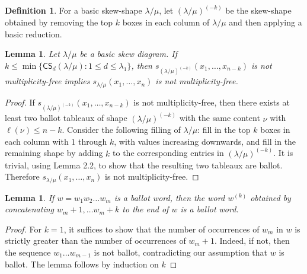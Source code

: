 \documentclass[10pt]{article}
\newtheorem{lemma}[theorem]{Lemma}
\theoremstyle{definition}
\newtheorem{defi}[theorem]{Definition}
\newcommand{\CS	}{\mathsf{CS}}
\begin{document}
\begin{defi}
For a basic skew-shape $\lambda/\mu$, let $(\lambda/\mu)^{(-k)}$ be the skew-shape obtained by removing the top $k$ boxes in each column of $\lambda/\mu$ and then applying a basic reduction.
\end{defi}
\begin{lemma}\label{Lemma:krowreduction}
Let $\lambda / \mu$ be a basic skew diagram. If $k\leq \min\{ \CS _d(\lambda/\mu):1\leq d\leq \lambda_1\}$, then $s_{(\lambda/\mu)^{(-k)}}(x_1,\ldots,x_{n-k})$ is not multiplicity-free implies $s_{\lambda/\mu}(x_1,\ldots,x_n)$ is not multiplicity-free.
\end{lemma}
\begin{proof}
If $s_{(\lambda/\mu)^{(-k)}}(x_1,\ldots,x_{n-k})$ is not multiplicity-free, then there exists at least two ballot tableaux of shape $(\lambda/\mu)^{(-k)}$ with the same content $\nu$ with $\ell(\nu)\leq n-k$. Consider the following filling of $\lambda/\mu$: fill in the top $k$ boxes in each column with $1$ through $k$, with values increasing downwards, and fill in the remaining shape by adding $k$ to the corresponding entries in $(\lambda/\mu)^{(-k)}$. It is trivial, using Lemma 2.2, to show that the resulting two tableaux are ballot. Therefore $s_{\lambda/\mu}(x_1,\ldots,x_n)$ is not multiplicity-free.
\end{proof}
\begin{lemma}\label{Lemma:ballot}
If $w = w_1w_2\ldots w_m$ is a ballot word, then the word $w^{(k)}$ obtained by concatenating $w_m+1,\ldots w_m+k$ to the end of $w$ is a ballot word.
\end{lemma}

\begin{proof}
For $k=1$, it suffices to show that the number of occurrences of $w_m$ in $w$ is strictly greater than the number of occurrences of $w_m+1$. Indeed, if not, then the sequence $w_1\ldots w_{m-1}$ is not ballot, contradicting our assumption that $w$ is ballot. The lemma follows by induction on $k$
\end{proof}
\end{document}
